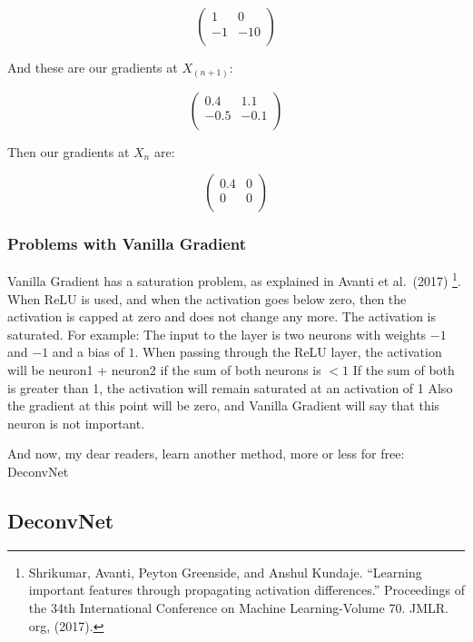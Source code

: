 \documentclass[
  10pt,
]{scrbook}
\begin{document}
\[
\begin{pmatrix}
1 & 0 \\
-1 & -10 \\
\end{pmatrix}
\]

And these are our gradients at \(X_{(n+1)}\):

\[
\begin{pmatrix}
0.4 & 1.1 \\
-0.5 & -0.1  \\
\end{pmatrix}
\]

Then our gradients at \(X_n\) are:

\[
\begin{pmatrix}
0.4 & 0 \\
 0 & 0  \\
\end{pmatrix}
\]

\hypertarget{problems-with-vanilla-gradient}{%
\subsubsection{Problems with Vanilla Gradient}\label{problems-with-vanilla-gradient}}

Vanilla Gradient has a saturation problem, as explained in Avanti et al.~(2017) \footnote{Shrikumar, Avanti, Peyton Greenside, and Anshul Kundaje. ``Learning important features through propagating activation differences.'' Proceedings of the 34th International Conference on Machine Learning-Volume 70. JMLR. org, (2017).}.
When ReLU is used, and when the activation goes below zero, then the activation is capped at zero and does not change any more.
The activation is saturated.
For example: The input to the layer is two neurons with weights \(-1\) and \(-1\) and a bias of \(1\).
When passing through the ReLU layer, the activation will be neuron1 + neuron2 if the sum of both neurons is \(<1\)
If the sum of both is greater than 1, the activation will remain saturated at an activation of 1
Also the gradient at this point will be zero, and Vanilla Gradient will say that this neuron is not important.

And now, my dear readers, learn another method, more or less for free: DeconvNet

\hypertarget{deconvnet}{%
\subsection{DeconvNet}\label{deconvnet}}
\end{document}
